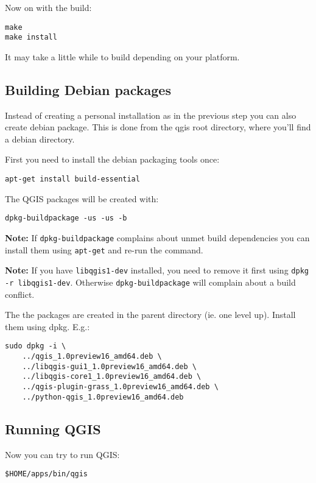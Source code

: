 Now on with the build:

\begin{verbatim}
make
make install
\end{verbatim}

It may take a little while to build depending on your platform.

\subsection{Building Debian packages}
Instead of creating a personal installation as in the previous step you can
also create debian package.  This is done from the qgis root directory, where
you'll find a debian directory.

First you need to install the debian packaging tools once:

\begin{verbatim}
apt-get install build-essential
\end{verbatim}

The QGIS packages will be created with:

\begin{verbatim}
dpkg-buildpackage -us -us -b
\end{verbatim}

\textbf{Note:} If \texttt{dpkg-buildpackage} complains about unmet build dependencies
you can install them using \texttt{apt-get} and re-run the command.

\textbf{Note:} If you have \texttt{libqgis1-dev} installed, you need to remove it first
using \texttt{dpkg -r libqgis1-dev}.  Otherwise \texttt{dpkg-buildpackage} will complain about a
build conflict.

The the packages are created in the parent directory (ie. one level up).
Install them using dpkg.  E.g.:

\begin{verbatim}
sudo dpkg -i \
	../qgis_1.0preview16_amd64.deb \
	../libqgis-gui1_1.0preview16_amd64.deb \
	../libqgis-core1_1.0preview16_amd64.deb \
	../qgis-plugin-grass_1.0preview16_amd64.deb \
	../python-qgis_1.0preview16_amd64.deb
\end{verbatim}

\subsection{Running QGIS}
Now you can try to run QGIS:

\begin{verbatim}
$HOME/apps/bin/qgis 
\end{verbatim}

